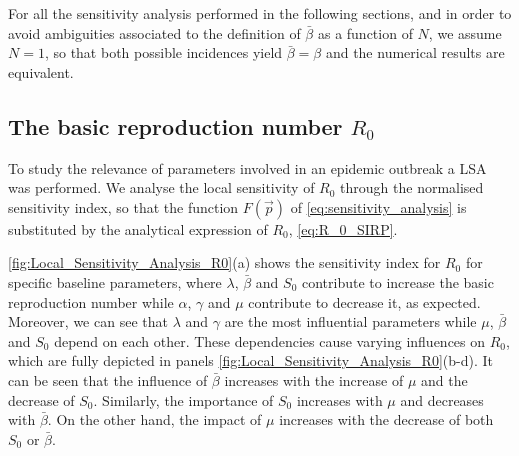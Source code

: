 For all the sensitivity analysis performed in the following sections, and
in order to avoid ambiguities associated to the definition of $\bar{\beta}$ as
a function of $N$, we assume $N=1$, so that both possible incidences yield
$\bar{\beta}=\beta$ and the numerical results are equivalent.

\subsection{The basic reproduction number $R_0$}

To study the relevance of parameters involved in an epidemic outbreak a LSA
was performed. We analyse the local sensitivity of $R_0$ through the normalised
sensitivity index, so that the function $F(\vec{p})$ of
\cref{eq:sensitivity_analysis} is substituted by the analytical expression of
$R_0$, \cref{eq:R_0_SIRP}.

\cref{fig:Local_Sensitivity_Analysis_R0}(a) shows the sensitivity index for
$R_0$ for specific baseline parameters, where $\lambda$, $\bar{\beta}$ and
$S_0$ contribute to increase the basic reproduction number while $\alpha$,
$\gamma$ and $\mu$ contribute to decrease it, as expected. Moreover, we can see
that $\lambda$ and $\gamma$ are the most influential parameters while $\mu$,
$\bar{\beta}$ and $S_0$ depend on each other. These dependencies cause varying
influences on $R_0$, which are fully depicted in panels
\cref{fig:Local_Sensitivity_Analysis_R0}(b-d). It can be seen that the
influence of $\bar{\beta}$ increases with the increase of $\mu$ and the
decrease of $S_0$. Similarly, the importance of $S_0$ increases with $\mu$ and
decreases with $\bar{\beta}$. On the other hand, the impact of $\mu$ increases
with the decrease of both $S_0$ or $\bar{\beta}$.

